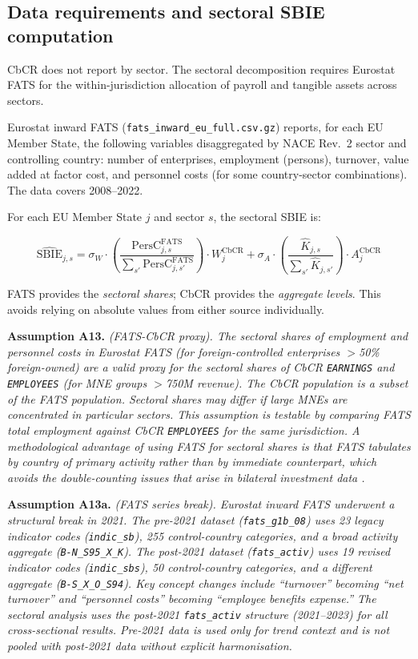 \documentclass[11pt,a4paper]{article}
\newcommand{\EUR}{\texteuro}
\newcommand{\code}[1]{\texttt{#1}}
\newcommand{\assumption}[2]{\noindent\textbf{Assumption #1.} \textit{#2}\medskip}
\begin{document}
\subsection{Data requirements and sectoral SBIE computation}\label{sec:sbie_data}

CbCR does not report by sector. The sectoral decomposition requires Eurostat FATS for the within-jurisdiction allocation of payroll and tangible assets across sectors.

Eurostat inward FATS (\code{fats\_inward\_eu\_full.csv.gz}) reports, for each EU Member State, the following variables disaggregated by NACE Rev.~2 sector and controlling country: number of enterprises, employment (persons), turnover, value added at factor cost, and personnel costs (for some country-sector combinations). The data covers 2008--2022.

For each EU Member State $j$ and sector $s$, the sectoral SBIE is:

\begin{equation}\label{eq:sbie_sectoral}
\widehat{\text{SBIE}}_{j,s} = \sigma_W \cdot \left(\frac{\text{PersC}_{j,s}^{\text{FATS}}}{\sum_{s'} \text{PersC}_{j,s'}^{\text{FATS}}}\right) \cdot W_j^{\text{CbCR}} + \sigma_A \cdot \left(\frac{\hat{K}_{j,s}}{\sum_{s'} \hat{K}_{j,s'}}\right) \cdot A_j^{\text{CbCR}}
\end{equation}

FATS provides the \emph{sectoral shares}; CbCR provides the \emph{aggregate levels}. This avoids relying on absolute values from either source individually.

\assumption{A13}{(FATS-CbCR proxy). The sectoral shares of employment and personnel costs in Eurostat FATS (for foreign-controlled enterprises $>$50\% foreign-owned) are a valid proxy for the sectoral shares of CbCR \code{EARNINGS} and \code{EMPLOYEES} (for MNE groups $>$\EUR750M revenue). The CbCR population is a subset of the FATS population. Sectoral shares may differ if large MNEs are concentrated in particular sectors. This assumption is testable by comparing FATS total employment against CbCR \code{EMPLOYEES} for the same jurisdiction. A methodological advantage of using FATS for sectoral shares is that FATS tabulates by country of primary activity rather than by immediate counterpart, which avoids the double-counting issues that arise in bilateral investment data \citep{torslov2022}.}

\assumption{A13a}{(FATS series break). Eurostat inward FATS underwent a structural break in 2021. The pre-2021 dataset (\code{fats\_g1b\_08}) uses 23 legacy indicator codes (\code{indic\_sb}), 255 control-country categories, and a broad activity aggregate (\code{B-N\_S95\_X\_K}). The post-2021 dataset (\code{fats\_activ}) uses 19 revised indicator codes (\code{indic\_sbs}), 50 control-country categories, and a different aggregate (\code{B-S\_X\_O\_S94}). Key concept changes include ``turnover'' becoming ``net turnover'' and ``personnel costs'' becoming ``employee benefits expense.'' The sectoral analysis uses the post-2021 \code{fats\_activ} structure (2021--2023) for all cross-sectional results. Pre-2021 data is used only for trend context and is not pooled with post-2021 data without explicit harmonisation.}
\end{document}
